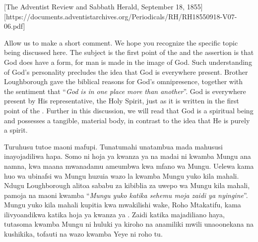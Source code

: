 [The Adventist Review and Sabbath Herald, September 18, 1855][https://documents.adventistarchives.org/Periodicals/RH/RH18550918-V07-06.pdf]


Allow us to make a short comment. We hope you recognize the specific topic being discussed here. The subject is the first point of the  and the assertion is that God does have a form, for man is made in the image of God. Such understanding of God’s personality precludes the idea that God is everywhere present. Brother Loughborough gave the biblical reasons for God's omnipresence, together with the sentiment that “\textit{God is in one place more than another}”. God is everywhere present by His representative, the Holy Spirit, just as it is written in the first point of the . Further in this discussion, we will read that God is a spiritual being and possesses a tangible, material body, in contrast to the idea that He is purely a spirit.


Turuhusu tutoe maoni mafupi. Tunatumahi unatambua mada mahususi inayojadiliwa hapa. Somo ni hoja ya kwanza ya  na madai ni kwamba Mungu ana namna, kwa maana mwanadamu ameumbwa kwa mfano wa Mungu. Uelewa kama huo wa ubinafsi wa Mungu huzuia wazo la kwamba Mungu yuko kila mahali. Ndugu Loughborough alitoa sababu za kibiblia za uwepo wa Mungu kila mahali, pamoja na maoni kwamba “\textit{Mungu yuko katika sehemu moja zaidi ya nyingine}”. Mungu yuko kila mahali kupitia kwa mwakilishi wake, Roho Mtakatifu, kama ilivyoandikwa katika hoja ya kwanza ya . Zaidi katika majadiliano haya, tutasoma kwamba Mungu ni huluki ya kiroho na anamiliki mwili unaoonekana na kushikika, tofauti na wazo kwamba Yeye ni roho tu.


